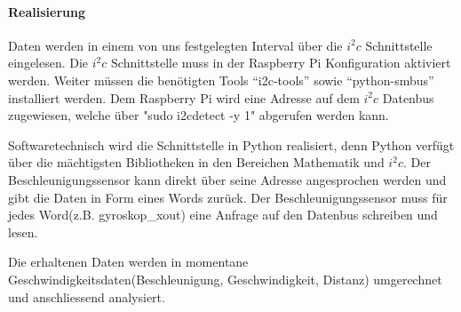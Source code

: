 \documentclass[../../main.tex]{subfiles}
\begin{document}
\paragraph{Realisierung}
Daten werden in einem von uns festgelegten Interval über die $i^2c$ Schnittstelle eingelesen. Die $i^2c$ Schnittstelle muss in der Raspberry Pi Konfiguration aktiviert werden. Weiter müssen die benötigten Tools ``i2c-tools'' sowie ``python-smbus'' installiert werden. Dem Raspberry Pi wird eine Adresse auf dem $i^2c$ Datenbus zugewiesen, welche über "sudo i2cdetect -y 1" abgerufen werden kann.

Softwaretechnisch wird die Schnittstelle in Python realisiert, denn Python verfügt über die mächtigsten Bibliotheken in den Bereichen Mathematik und $i^2c$. Der Beschleunigungssensor kann direkt über seine Adresse angesprochen werden und gibt die Daten in Form eines Words zurück. Der Beschleunigungssensor muss für jedes Word(z.B. gyroskop\_xout) eine Anfrage auf den Datenbus schreiben und lesen.

Die erhaltenen Daten werden in momentane Geschwindigkeitsdaten(Beschleunigung, Geschwindigkeit, Distanz) umgerechnet und anschliessend analysiert.
\end{document}
